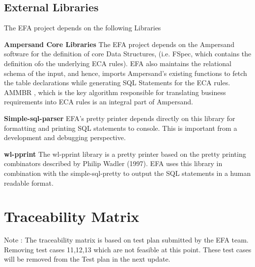 \documentclass[12pt, svgnames]{article}
\begin{document}
{{{{{{{{\subsection{External Libraries}
The EFA project depends on the following Libraries 
\begin{description}
	\item \textbf{Ampersand Core Libraries} \newline
		The EFA project depends on the Ampersand software for the definition of 
		core Data Structures, (i.e. FSpec, which contains the definition ofo 
		the underlying ECA rules). EFA also maintains the relational schema of 
		the input, and hence, imports Ampersand's existing functions to fetch 
		the table declarations while generating SQL Statements for the ECA 
		rules. AMMBR \cite{AMMBR}, which is the key algorithm responsible for 
		translating business requirements into ECA rules is an integral part of 
		Ampersand.
	\item \textbf{Simple-sql-parser} \newline
		EFA's pretty printer depends directly on this library for formatting 
		and printing SQL statements to console. This is important from a 
		development and debugging perspective.\cite{simple-sql}
	\item \textbf{wl-pprint} \newline
		The wl-pprint library\cite{wl-pprint} is a pretty printer based on the pretty printing combinators described by Philip Wadler (1997). EFA uses this library in combination with the simple-sql-pretty to output the SQL statements in a human readable format.
	\item 
\end{description}

\section{Traceability Matrix} \label{SecTM}

Note : The traceability matrix is based on test plan submitted by the EFA team. Removing test cases 11,12,13 which are not feasible at this point. These test cases will be removed from the Test plan in the next update.

}}}}}}}}
\end{document}

